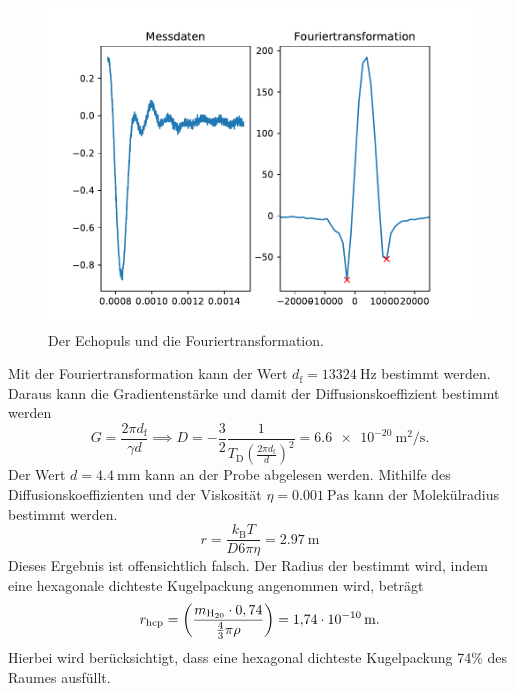 \begin{figure}
  \centering
  \includegraphics[width = \textwidth,keepaspectratio]{figure/Fouriertrafo.pdf}
  \caption{Der Echopuls und die Fouriertransformation.}
\end{figure}
\FloatBarrier
Mit der Fouriertransformation kann der Wert $d_{\text{f}} = \SI{13324}{\hertz}$ bestimmt werden.
Daraus kann die Gradientenstärke und damit der Diffusionskoeffizient bestimmt werden
\begin{equation*}
  G=\frac{2\pi d_{\text{f}}}{\gamma d} \implies D = -\frac{3}{2} \frac{1}{T_{\text{D}} \left(\frac{2\pi d_{\text{f}}}{d}\right)^2}=\SI{6.6e-20}{\square\meter\per\second}.
\end{equation*}
Der Wert $d=\SI{4.4}{\milli\meter}$ kann an der Probe abgelesen werden.
Mithilfe des Diffusionskoeffizienten und der Viskosität $\eta = \SI{0.001}{\pascal\second}$ kann der Molekülradius bestimmt werden. 
\begin{equation*}
  r=\frac{k_{\text{B}}T}{D6\pi \eta} = \SI{2.97}{\meter}
\end{equation*}
Dieses Ergebnis ist offensichtlich falsch.
Der Radius der bestimmt wird, indem eine hexagonale dichteste Kugelpackung angenommen wird, beträgt 
\begin{equation*}
  r_{\text{hcp}} = \left(\frac{m_{\ce{H20}}\cdot 0,74}{\frac{4}{3}\pi \rho}\right)= \SI{1.74e-10}{\meter}.
\end{equation*}
Hierbei wird berücksichtigt, dass eine hexagonal dichteste Kugelpackung 74\% des Raumes ausfüllt.